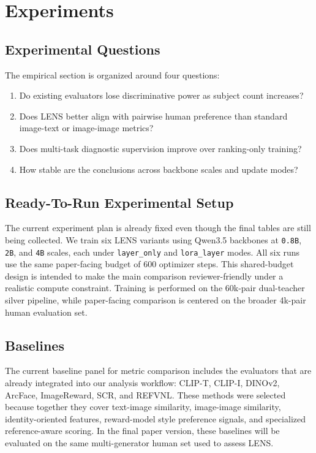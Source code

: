\section{Experiments}

\subsection{Experimental Questions}
The empirical section is organized around four questions:
\begin{enumerate}
    \item Do existing evaluators lose discriminative power as subject count increases?
    \item Does LENS better align with pairwise human preference than standard image-text or image-image metrics?
    \item Does multi-task diagnostic supervision improve over ranking-only training?
    \item How stable are the conclusions across backbone scales and update modes?
\end{enumerate}

\subsection{Ready-To-Run Experimental Setup}
The current experiment plan is already fixed even though the final tables are still being collected. We train six LENS variants using Qwen3.5 backbones at \texttt{0.8B}, \texttt{2B}, and \texttt{4B} scales, each under \texttt{layer\_only} and \texttt{lora\_layer} modes. All six runs use the same paper-facing budget of 600 optimizer steps. This shared-budget design is intended to make the main comparison reviewer-friendly under a realistic compute constraint. Training is performed on the 60k-pair dual-teacher silver pipeline, while paper-facing comparison is centered on the broader 4k-pair human evaluation set.

\subsection{Baselines}
The current baseline panel for metric comparison includes the evaluators that are already integrated into our analysis workflow: CLIP-T, CLIP-I, DINOv2, ArcFace, ImageReward, SCR, and REFVNL. These methods were selected because together they cover text-image similarity, image-image similarity, identity-oriented features, reward-model style preference signals, and specialized reference-aware scoring. In the final paper version, these baselines will be evaluated on the same multi-generator human set used to assess LENS.

